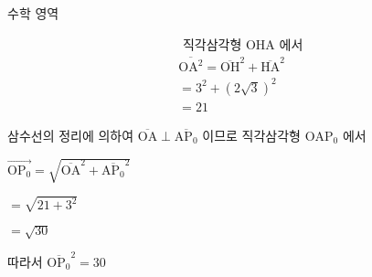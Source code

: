 \documentclass[10pt]{article}
\begin{document}
수학 영역

\[
\begin{aligned}
& \text { 직각삼각형 } \mathrm{OHA} \text { 에서 } \\
& \overline{\mathrm{OA}^{2}}=\overline{\mathrm{OH}}^{2}+\overline{\mathrm{HA}}^{2} \\
&=3^{2}+(2 \sqrt{3})^{2} \\
&=21
\end{aligned}
\]

삼수선의 정리에 의하여 \(\overline{\mathrm{OA}} \perp \overline{\mathrm{AP}_{0}}\) 이므로 직각삼각형 \(\mathrm{OAP}_{0}\) 에서

\(\overrightarrow{\mathrm{OP}_{0}}=\sqrt{\overline{\mathrm{OA}}^{2}+{\overline{\mathrm{AP}_{0}}}^{2}}\)

\(=\sqrt{21+3^{2}}\)

\(=\sqrt{30}\)

따라서 \({\overline{\mathrm{OP}_{0}}}^{2}=30\)
\end{document}
